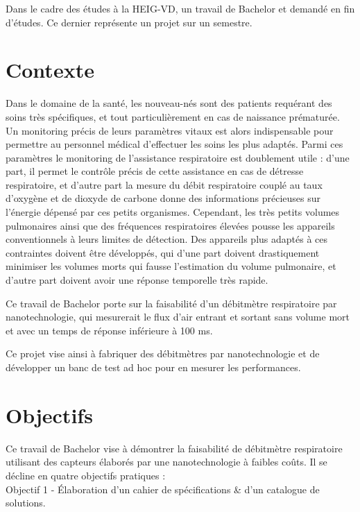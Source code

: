 Dans le cadre des études à la HEIG-VD, un travail de Bachelor et demandé en fin d'études. Ce dernier représente un projet sur un semestre. 

\section{Contexte}
Dans le domaine de la santé, les nouveau-nés sont des patients requérant des soins très spécifiques, et tout particulièrement en cas de 
naissance prématurée. Un monitoring précis de leurs paramètres vitaux est alors indispensable pour permettre au personnel médical d'effectuer 
les soins les plus adaptés. Parmi ces paramètres le monitoring de l'assistance respiratoire est doublement utile : d'une part, il permet le 
contrôle précis de cette assistance en cas de détresse respiratoire, et d'autre part la mesure du débit respiratoire couplé au taux d'oxygène 
et de dioxyde de carbone donne des informations précieuses sur l'énergie dépensé par ces petits organismes. Cependant, les très petits volumes 
pulmonaires ainsi que des fréquences respiratoires élevées pousse les appareils conventionnels à leurs limites de détection. Des appareils plus 
adaptés à ces contraintes doivent être développés, qui d'une part doivent drastiquement minimiser les volumes morts qui fausse l'estimation du 
volume pulmonaire, et d'autre part doivent avoir une réponse temporelle très rapide. 

Ce travail de Bachelor porte sur la faisabilité d'un débitmètre respiratoire par nanotechnologie, qui mesurerait le flux d'air entrant et 
sortant sans volume mort et avec un temps de réponse inférieure à 100 ms. 

Ce projet vise ainsi à fabriquer des débitmètres par nanotechnologie et de développer un banc de test ad hoc pour en mesurer les performances.  

\section{Objectifs}
Ce travail de Bachelor vise à démontrer la faisabilité de débitmètre respiratoire utilisant des capteurs élaborés par une nanotechnologie à 
faibles coûts. Il se décline en quatre objectifs pratiques : \\
Objectif 1 - Élaboration d'un cahier de spécifications \& d'un catalogue de solutions. \\

